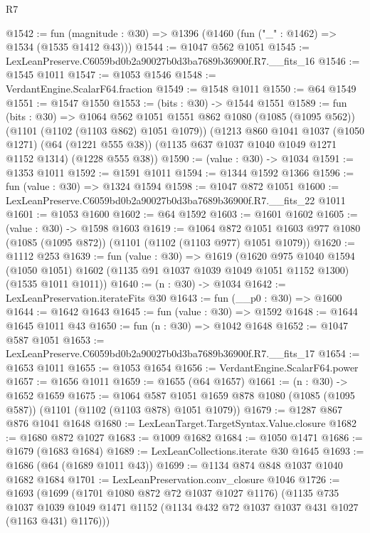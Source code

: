 \begin{lexlean}{R7}
\begin{coremodule}
@1542 := fun (magnitude : @30) => @1396 (@1460 (fun ("_" : @1462) => @1534 (@1535 @1412 @43)))
@1544 := @1047 @562 @1051
@1545 := LexLeanPreserve.C6059bd0b2a90027b0d3ba7689b36900f.R7.__fits_16
@1546 := @1545 @1011
@1547 := @1053 @1546
@1548 := VerdantEngine.ScalarF64.fraction
@1549 := @1548 @1011
@1550 := @64 @1549
@1551 := @1547 @1550
@1553 := (bits : @30) -> @1544 @1551
@1589 := fun (bits : @30) =>
  @1064
    @562
    @1051
    @1551
    @862
    @1080
    (@1085 (@1095 @562))
    (@1101 (@1102 (@1103 @862) @1051 @1079))
    (@1213
      @860
      @1041
      @1037
      (@1050 @1271)
      (@64 (@1221 @555 @38))
      (@1135 @637 @1037 @1040 @1049 @1271 @1152 @1314)
      (@1228 @555 @38))
@1590 := (value : @30) -> @1034
@1591 := @1353 @1011
@1592 := @1591 @1011
@1594 := @1344 @1592 @1366
@1596 := fun (value : @30) => @1324 @1594
@1598 := @1047 @872 @1051
@1600 := LexLeanPreserve.C6059bd0b2a90027b0d3ba7689b36900f.R7.__fits_22 @1011
@1601 := @1053 @1600
@1602 := @64 @1592
@1603 := @1601 @1602
@1605 := (value : @30) -> @1598 @1603
@1619 := @1064
    @872
    @1051
    @1603
    @977
    @1080
    (@1085 (@1095 @872))
    (@1101 (@1102 (@1103 @977) @1051 @1079))
@1620 := @1112 @253
@1639 := fun (value : @30) =>
  @1619
    (@1620
      @975
      @1040
      @1594
      (@1050 @1051)
      @1602
      (@1135 @91 @1037 @1039 @1049 @1051 @1152 @1300)
      (@1535 @1011 @1011))
@1640 := (n : @30) -> @1034
@1642 := LexLeanPreservation.iterateFits @30
@1643 := fun (__p0 : @30) => @1600
@1644 := @1642 @1643
@1645 := fun (value : @30) => @1592
@1648 := @1644 @1645 @1011 @43
@1650 := fun (n : @30) => @1042 @1648
@1652 := @1047 @587 @1051
@1653 := LexLeanPreserve.C6059bd0b2a90027b0d3ba7689b36900f.R7.__fits_17
@1654 := @1653 @1011
@1655 := @1053 @1654
@1656 := VerdantEngine.ScalarF64.power
@1657 := @1656 @1011
@1659 := @1655 (@64 @1657)
@1661 := (n : @30) -> @1652 @1659
@1675 := @1064
    @587
    @1051
    @1659
    @878
    @1080
    (@1085 (@1095 @587))
    (@1101 (@1102 (@1103 @878) @1051 @1079))
@1679 := @1287 @867 @876 @1041 @1648
@1680 := LexLeanTarget.TargetSyntax.Value.closure
@1682 := @1680 @872 @1027
@1683 := @1009 @1682
@1684 := @1050 @1471
@1686 := @1679 (@1683 @1684)
@1689 := LexLeanCollections.iterate @30 @1645
@1693 := @1686 (@64 (@1689 @1011 @43))
@1699 := @1134 @874 @848 @1037 @1040 @1682 @1684
@1701 := LexLeanPreservation.conv_closure @1046
@1726 := @1693
    (@1699
      (@1701 @1080 @872 @72 @1037 @1027 @1176)
      (@1135
        @735
        @1037
        @1039
        @1049
        @1471
        @1152
        (@1134 @432 @72 @1037 @1037 @431 @1027 (@1163 @431) @1176)))

\end{coremodule}
\end{lexlean}
